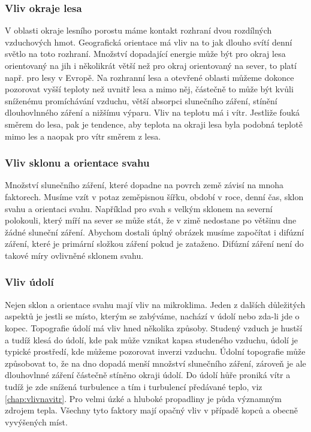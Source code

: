 \subsubsection{Vliv okraje lesa}
V oblasti okraje lesního porostu máme kontakt rozhraní dvou rozdílných vzduchových hmot. Geografická orientace má vliv na to jak dlouho svítí denní světlo na toto rozhraní. Množství dopadající energie může být pro okraj lesa orientovaný na jih i několikrát větší než pro okraj orientovaný na sever, to platí např. pro lesy v Evropě. Na rozhranní lesa a otevřené oblasti můžeme dokonce pozorovat vyšší teploty než uvnitř lesa a mimo něj, částečně to může být kvůli sníženému promíchávání vzduchu, větší absorpci slunečního záření, stínění dlouhovlnného záření a nižšímu výparu. Vliv na teplotu má i vítr. Jestliže fouká směrem do lesa, pak je tendence, aby teplota na okraji lesa byla podobná teplotě mimo les a naopak pro vítr směrem z lesa\cite{alma}.

\subsubsection{Vliv sklonu a orientace svahu}
Množství slunečního záření, které dopadne na povrch země závisí na mnoha faktorech. Musíme vzít v potaz zeměpisnou šířku, období v roce, denní čas, sklon svahu a orientaci svahu. Například pro svah s velkým sklonem na severní polokouli, který míří na sever se může stát, že v zimě nedostane po většinu dne žádné sluneční záření. Abychom dostali úplný obrázek musíme započítat i difúzní záření, které je primární složkou záření pokud je zataženo. Difúzní záření není do takové míry ovlivněné sklonem svahu\cite{alma}.

\subsubsection{Vliv údolí}
Nejen sklon a orientace svahu mají vliv na mikroklima. Jeden z dalších důležitých aspektů je jestli se místo, kterým se zabýváme, nachází v údolí nebo zda-li jde o kopec. Topografie údolí má vliv hned několika způsoby. Studený vzduch je hustší a tudíž klesá do údolí, kde pak může vznikat kapsa studeného vzduchu, údolí je typické prostředí, kde můžeme pozorovat inverzi vzduchu. Údolní topografie může způsobovat to, že na dno dopadá menší množství slunečního záření, zároveň je ale dlouhovlnné záření částečně stíněno okraji údolí. Do údolí hůře proniká vítr a tudíž je zde snížená turbulence a tím i turbulencí předávané teplo, viz \ref{chap:vlivnavitr}. Pro velmi úzké a hluboké propadliny je půda významným zdrojem tepla. Všechny tyto faktory mají opačný vliv v případě kopců a obecně vyvýšených míst\cite{alma}. 

